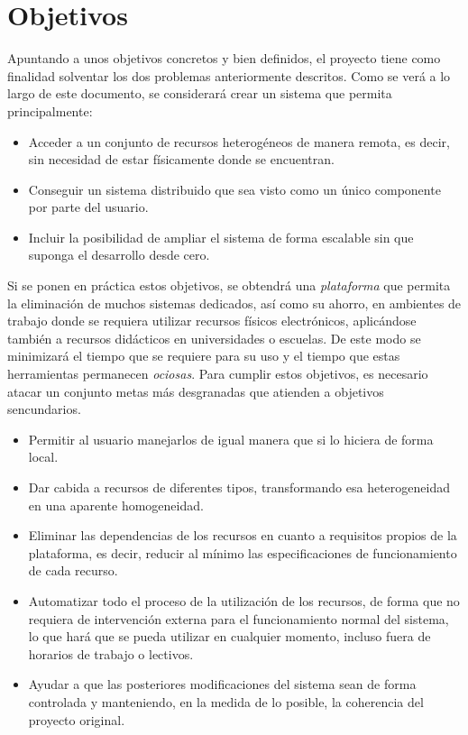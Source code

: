 \section{Objetivos}

Apuntando a unos objetivos concretos y bien definidos, el proyecto 
tiene como finalidad solventar los dos problemas anteriormente 
descritos. Como se verá a lo largo de este documento, se considerará 
crear un sistema que permita principalmente:

\begin{itemize}
\item Acceder a un conjunto de recursos heterogéneos de manera remota, 
es decir, sin necesidad de estar físicamente donde se encuentran. 
\item Conseguir un sistema distribuido que sea visto como un único 
componente por parte del usuario.
\item Incluir la posibilidad de ampliar el sistema de forma escalable 
sin que suponga el desarrollo desde cero.
\end{itemize}

Si se ponen en práctica estos objetivos, se obtendrá una 
\emph{plataforma} que permita la eliminación de muchos sistemas 
dedicados, así como su ahorro, en ambientes de trabajo donde se 
requiera utilizar recursos físicos electrónicos, aplicándose 
también a recursos didácticos en universidades o escuelas. 
De este modo se minimizará el tiempo que se requiere para su uso y el tiempo 
que estas herramientas permanecen \emph{ociosas}. Para cumplir estos 
objetivos, es necesario atacar un conjunto metas más desgranadas que 
atienden a objetivos sencundarios. 

\begin{itemize}
\item Permitir al usuario manejarlos de igual manera que si lo hiciera 
de forma local.
\item Dar cabida a recursos de diferentes tipos, 
transformando esa heterogeneidad en una aparente homogeneidad.
\item Eliminar las dependencias de los recursos en cuanto a requisitos 
propios de la plataforma, es decir, reducir al mínimo las especificaciones 
de funcionamiento de cada recurso.
\item Automatizar todo el proceso de la utilización de los recursos, de 
forma que no requiera de intervención externa para el funcionamiento 
normal del sistema, lo que hará que se pueda utilizar en cualquier 
momento, incluso fuera de horarios de trabajo o lectivos.
\item Ayudar a que las posteriores modificaciones del sistema sean de 
forma controlada y manteniendo, en la medida de lo posible, la 
coherencia del proyecto original.
\end{itemize}

